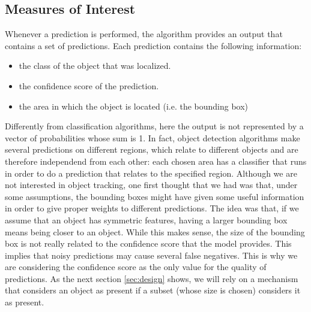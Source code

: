 \documentclass[10pt,conference,compsocconf]{IEEEtran}
\begin{document}
\subsection{Measures of Interest}
Whenever a prediction is performed, the algorithm provides an output that contains a set of predictions. Each prediction contains the following information:
\begin{itemize}
\item the class of the object that was localized.
\item the confidence score of the prediction.
\item the area in which the object is located (i.e. the bounding box)
\end{itemize}
Differently from classification algorithms, here the output is not represented by a vector of probabilities whose sum is 1. In fact, object detection algorithms make several predictions on different regions, which relate to different objects and are therefore independend from each other: each chosen area has a classifier that runs in order to do a prediction that relates to the specified region.
Although we are not interested in object tracking, one first thought that we had was that, under some assumptions, the bounding boxes might have given some useful information in order to give proper weights to different predictions. The idea was that, if we assume that an object has symmetric features, having a larger bounding box means being closer to an object. While this makes sense, the size of the bounding box is not really related to the confidence score that the model provides. This implies that noisy predictions may cause several false negatives. This is why we are considering the confidence score as the only value for the quality of predictions. As the next section \ref{sec:design} shows, we will rely on a mechanism that considers an object as present if a subset (whose size is chosen) considers it as present.
\end{document}
